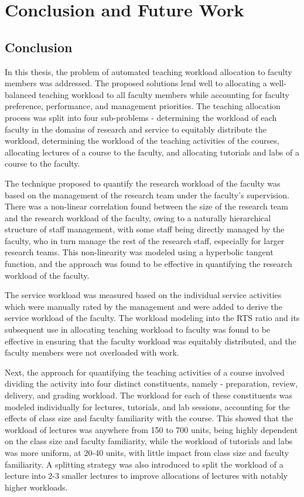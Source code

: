 \chapter{Conclusion and Future Work}

\section{Conclusion}

In this thesis, the problem of automated teaching workload allocation to faculty members was addressed. The proposed solutions lend well to allocating a well-balanced teaching workload to all faculty members while accounting for faculty preference, performance, and management priorities. The teaching allocation process was split into four sub-problems - determining the workload of each faculty in the domains of research and service to equitably distribute the workload, determining the workload of the teaching activities of the courses, allocating lectures of a course to the faculty, and allocating tutorials and labs of a course to the faculty.

The technique proposed to quantify the research workload of the faculty was based on the management of the research team under the faculty's supervision. There was a non-linear correlation found between the size of the research team and the research workload of the faculty, owing to a naturally hierarchical structure of staff management, with some staff being directly managed by the faculty, who in turn manage the rest of the research staff, especially for larger research teams. This non-linearity was modeled using a hyperbolic tangent function, and the approach was found to be effective in quantifying the research workload of the faculty.

The service workload was measured based on the individual service activities which were manually rated by the management and were added to derive the service workload of the faculty. The workload modeling into the RTS ratio and its subsequent use in allocating teaching workload to faculty was found to be effective in ensuring that the faculty workload was equitably distributed, and the faculty members were not overloaded with work.

Next, the approach for quantifying the teaching activities of a course involved dividing the activity into four distinct constituents, namely - preparation, review, delivery, and grading workload. The workload for each of these constituents was modeled individually for lectures, tutorials, and lab sessions, accounting for the effects of class size and faculty familiarity with the course. This showed that the workload of lectures was anywhere from 150 to 700 units, being highly dependent on the class size and faculty familiarity, while the workload of tutorials and labs was more uniform, at 20-40 units, with little impact from class size and faculty familiarity. A splitting strategy was also introduced to split the workload of a lecture into 2-3 smaller lectures to improve allocations of lectures with notably higher workloads.

